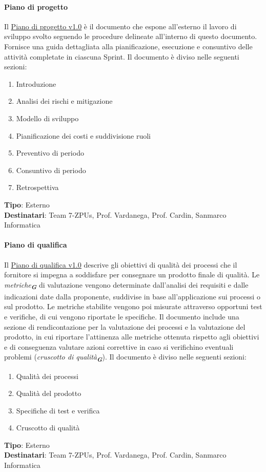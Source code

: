 \documentclass[a4paper,12pt]{article}
\newcommand{\glossario}[1]{\textit{#1}\textsubscript{\textbf{\textit{\textcolor{lightblack}{G}}}}}
\begin{document}
\paragraph{Piano di progetto}\label{pianoDiProgetto}
Il
\href{https://7-zpus.github.io/Docs/assets/pdf/PianoDiProgetto.pdf}{\ul{Piano di progetto v1.0}} è il documento che espone all'esterno il lavoro di sviluppo svolto seguendo le procedure delineate all'interno di questo documento. Fornisce una guida dettagliata alla pianificazione, esecuzione e consuntivo delle attività completate in ciascuna Sprint. Il documento è diviso nelle seguenti sezioni:
\begin{enumerate}
    \item Introduzione
    \item Analisi dei rischi e mitigazione
    \item Modello di sviluppo
    \item Pianificazione dei costi e suddivisione ruoli
    \item Preventivo di periodo
    \item Consuntivo di periodo
    \item Retrospettiva
\end{enumerate}
\textbf{Tipo}: Esterno \\
\textbf{Destinatari}: Team 7-ZPUs, Prof. Vardanega, Prof. Cardin, Sanmarco Informatica \\

\paragraph{Piano di qualifica}\label{pianoDiQualifica}
Il 
\href{https://7-zpus.github.io/Docs/assets/pdf/PianoDiQualifica.pdf}{\ul{Piano di qualifica v1.0}} descrive gli obiettivi di qualità dei processi che il fornitore si impegna a soddisfare per consegnare un prodotto finale di qualità. Le \glossario{metriche} di valutazione vengono determinate dall'analisi dei requisiti e dalle indicazioni date dalla proponente, suddivise in base all'applicazione sui processi o sul prodotto. Le metriche stabilite vengono poi misurate attraverso opportuni test e verifiche, di cui vengono riportate le specifiche. Il documento include una sezione di rendicontazione per la valutazione dei processi e la valutazione del prodotto, in cui riportare l'attinenza alle metriche ottenuta rispetto agli obiettivi e di conseguenza valutare azioni correttive in caso si verifichino eventuali problemi (\glossario{cruscotto di qualità}). Il documento è diviso nelle seguenti sezioni:
\begin{enumerate}
    \item Qualità dei processi
    \item Qualità del prodotto
    \item Specifiche di test e verifica
    \item Cruscotto di qualità
\end{enumerate}
\textbf{Tipo}: Esterno \\
\textbf{Destinatari}: Team 7-ZPUs, Prof. Vardanega, Prof. Cardin, Sanmarco Informatica \\
\end{document}
